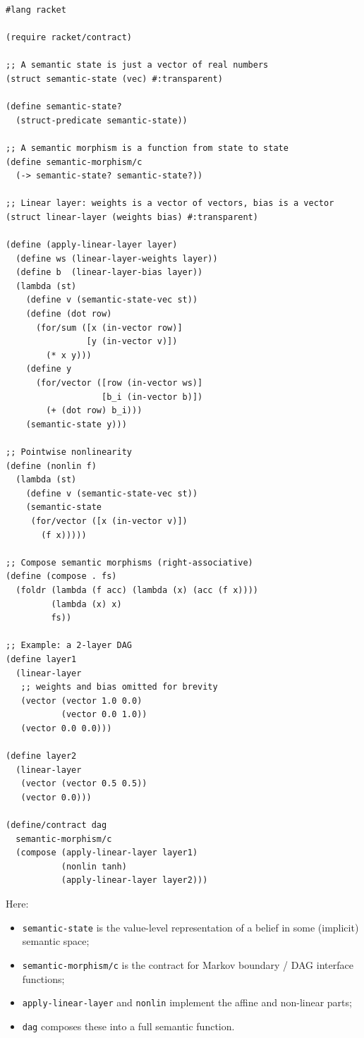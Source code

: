 \documentclass[12pt,letterpaper]{article}
\theoremstyle{remark}
\begin{document}
\begin{verbatim}
#lang racket

(require racket/contract)

;; A semantic state is just a vector of real numbers
(struct semantic-state (vec) #:transparent)

(define semantic-state?
  (struct-predicate semantic-state))

;; A semantic morphism is a function from state to state
(define semantic-morphism/c
  (-> semantic-state? semantic-state?))

;; Linear layer: weights is a vector of vectors, bias is a vector
(struct linear-layer (weights bias) #:transparent)

(define (apply-linear-layer layer)
  (define ws (linear-layer-weights layer))
  (define b  (linear-layer-bias layer))
  (lambda (st)
    (define v (semantic-state-vec st))
    (define (dot row)
      (for/sum ([x (in-vector row)]
                [y (in-vector v)])
        (* x y)))
    (define y
      (for/vector ([row (in-vector ws)]
                   [b_i (in-vector b)])
        (+ (dot row) b_i)))
    (semantic-state y)))

;; Pointwise nonlinearity
(define (nonlin f)
  (lambda (st)
    (define v (semantic-state-vec st))
    (semantic-state
     (for/vector ([x (in-vector v)])
       (f x)))))

;; Compose semantic morphisms (right-associative)
(define (compose . fs)
  (foldr (lambda (f acc) (lambda (x) (acc (f x))))
         (lambda (x) x)
         fs))

;; Example: a 2-layer DAG
(define layer1
  (linear-layer
   ;; weights and bias omitted for brevity
   (vector (vector 1.0 0.0)
           (vector 0.0 1.0))
   (vector 0.0 0.0)))

(define layer2
  (linear-layer
   (vector (vector 0.5 0.5))
   (vector 0.0)))

(define/contract dag
  semantic-morphism/c
  (compose (apply-linear-layer layer1)
           (nonlin tanh)
           (apply-linear-layer layer2)))
\end{verbatim}

Here:

\begin{itemize}
  \item \verb|semantic-state| is the value-level representation of a belief in some (implicit) semantic space;
  \item \verb|semantic-morphism/c| is the contract for Markov boundary / DAG interface functions;
  \item \verb|apply-linear-layer| and \verb|nonlin| implement the affine and non-linear parts;
  \item \verb|dag| composes these into a full semantic function.
\end{itemize}
\end{document}
